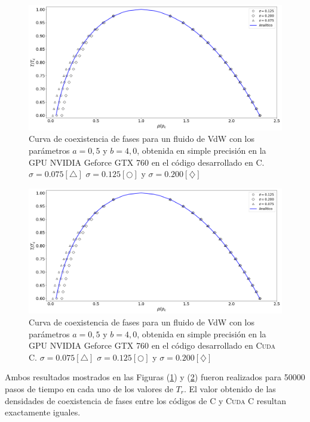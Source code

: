 \begin{figure}[htbp]
	\centering
	\includegraphics[width=\textwidth]{figs/cap4/v_760_MxC_c_simple}
	\caption{Curva de coexistencia de fases para un fluido de VdW con los parámetros $a = 0,5 $ y $b = 4,0 $, obtenida en simple precisión en la GPU NVIDIA Geforce GTX 760 en el código desarrollado en \textsc{C}. $\sigma = 0.075[\bigtriangleup]$	 $\sigma = 0.125[\bigcirc]$ y $\sigma = 0.200[\diamondsuit]$ }
 	\label{fig:v_760_MxC_c_simple}	
\end{figure}

\begin{figure}[htbp]
	\centering
	\includegraphics[width=\textwidth]{figs/cap4/v_760_MxC_cuda_simple}
	\caption{Curva de coexistencia de fases para un fluido de VdW con los parámetros $a = 0,5 $ y $b = 4,0 $, obtenida en simple precisión en la GPU NVIDIA Geforce GTX 760 en el código desarrollado en \textsc{Cuda C}. $\sigma = 0.075[\bigtriangleup]$	 $\sigma = 0.125[\bigcirc]$ y $\sigma = 0.200[\diamondsuit]$ }
	\label{fig:v_760_MxC_cuda_simple}	
\end{figure}

Ambos resultados mostrados en las Figuras (\ref{fig:v_760_MxC_c_simple}) y (\ref{fig:v_760_MxC_cuda_simple}) fueron realizados para 50000 pasos de tiempo en cada uno de los valores de $T_r$. El valor obtenido de las densidades de coexistencia de fases entre los códigos de \textsc{C} y \textsc{Cuda C} resultan exactamente iguales. 

